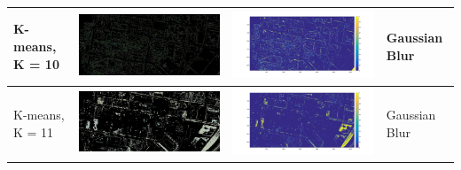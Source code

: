 \documentclass[fleqn,10pt]{SelfArx} %
\begin{document}
\begin{table}
\begin{tabular}{>{\centering\arraybackslash}M{8mm}cc>{\centering\arraybackslash}M{20mm}}
\midrule 
\vspace{-3cm}
\hspace{-0.6cm}
K-means, K = 10 & \includegraphics[clip,scale=0.07]{10rgb.jpg} & \includegraphics[trim={6cm 2.5cm 4.5cm 1.6cm},clip,scale=0.18]{10.jpg} & \vspace{-3cm}Gaussian Blur \\  
\midrule 
\vspace{-3cm}
\hspace{-0.6cm}
K-means, K = 11 & \includegraphics[clip,scale=0.07]{11rgb.jpg} & \includegraphics[trim={6cm 2.5cm 4.5cm 1.6cm},clip,scale=0.18]{11.jpg} & \vspace{-3cm}Gaussian Blur \\ 

\end{tabular}
\end{table}
\end{document}
